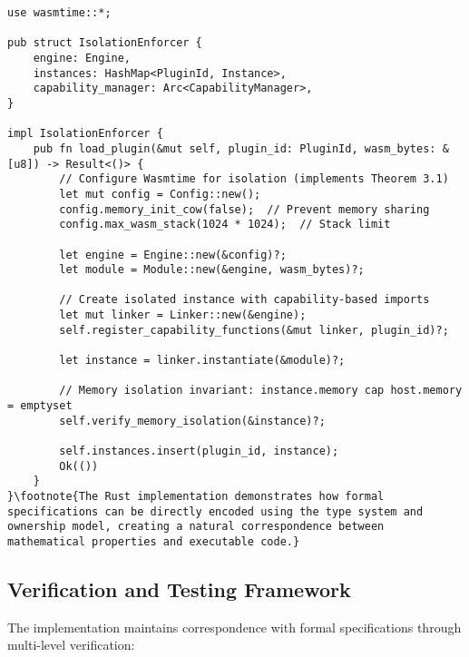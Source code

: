 \begin{lstlisting}[style=rust,caption={WebAssembly Isolation Implementation}]
use wasmtime::*;

pub struct IsolationEnforcer {
    engine: Engine,
    instances: HashMap<PluginId, Instance>,
    capability_manager: Arc<CapabilityManager>,
}

impl IsolationEnforcer {
    pub fn load_plugin(&mut self, plugin_id: PluginId, wasm_bytes: &[u8]) -> Result<()> {
        // Configure Wasmtime for isolation (implements Theorem 3.1)
        let mut config = Config::new();
        config.memory_init_cow(false);  // Prevent memory sharing
        config.max_wasm_stack(1024 * 1024);  // Stack limit
        
        let engine = Engine::new(&config)?;
        let module = Module::new(&engine, wasm_bytes)?;
        
        // Create isolated instance with capability-based imports
        let mut linker = Linker::new(&engine);
        self.register_capability_functions(&mut linker, plugin_id)?;
        
        let instance = linker.instantiate(&module)?;
        
        // Memory isolation invariant: instance.memory cap host.memory = emptyset
        self.verify_memory_isolation(&instance)?;
        
        self.instances.insert(plugin_id, instance);
        Ok(())
    }
}\footnote{The Rust implementation demonstrates how formal specifications can be directly encoded using the type system and ownership model, creating a natural correspondence between mathematical properties and executable code.}
\end{lstlisting}

\subsection{Verification and Testing Framework}

The implementation maintains correspondence with formal specifications through multi-level verification:

